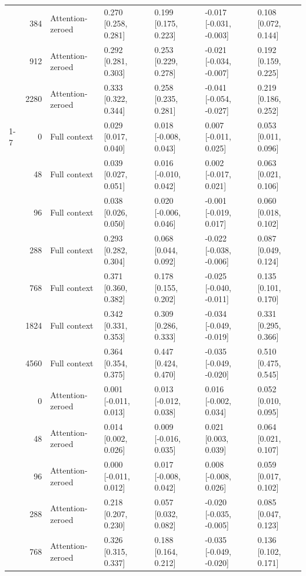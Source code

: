 \documentclass[11pt]{article}
\begin{document}
\begin{longtable}[t]{lrlllll}
\nopagebreak
 & 384 & Attention-zeroed & 0.270 [0.258, 0.281] & 0.199 [0.175, 0.223] & -0.017 [-0.031, -0.003] & 0.108 [0.072, 0.144]\\
\nopagebreak
 & 912 & Attention-zeroed & 0.292 [0.281, 0.303] & 0.253 [0.229, 0.278] & -0.021 [-0.034, -0.007] & 0.192 [0.159, 0.225]\\
\nopagebreak
\multirow{-14}{*}{\raggedright\arraybackslash BabyLM-125M} & 2280 & Attention-zeroed & 0.333 [0.322, 0.344] & 0.258 [0.235, 0.281] & -0.041 [-0.054, -0.027] & 0.219 [0.186, 0.252]\\
\cmidrule{1-7}\pagebreak[0]
 & 0 & Full context & 0.029 [0.017, 0.040] & 0.018 [-0.008, 0.043] & 0.007 [-0.011, 0.025] & 0.053 [0.011, 0.096]\\
\nopagebreak
 & 48 & Full context & 0.039 [0.027, 0.051] & 0.016 [-0.010, 0.042] & 0.002 [-0.017, 0.021] & 0.063 [0.021, 0.106]\\
\nopagebreak
 & 96 & Full context & 0.038 [0.026, 0.050] & 0.020 [-0.006, 0.046] & -0.001 [-0.019, 0.017] & 0.060 [0.018, 0.102]\\
\nopagebreak
 & 288 & Full context & 0.293 [0.282, 0.304] & 0.068 [0.044, 0.092] & -0.022 [-0.038, -0.006] & 0.087 [0.049, 0.124]\\
\nopagebreak
 & 768 & Full context & 0.371 [0.360, 0.382] & 0.178 [0.155, 0.202] & -0.025 [-0.040, -0.011] & 0.135 [0.101, 0.170]\\
\nopagebreak
 & 1824 & Full context & 0.342 [0.331, 0.353] & 0.309 [0.286, 0.333] & -0.034 [-0.049, -0.019] & 0.331 [0.295, 0.366]\\
\nopagebreak
 & 4560 & Full context & 0.364 [0.354, 0.375] & 0.447 [0.424, 0.470] & -0.035 [-0.049, -0.020] & 0.510 [0.475, 0.545]\\
\nopagebreak
 & 0 & Attention-zeroed & 0.001 [-0.011, 0.013] & 0.013 [-0.012, 0.038] & 0.016 [-0.002, 0.034] & 0.052 [0.010, 0.095]\\
\nopagebreak
 & 48 & Attention-zeroed & 0.014 [0.002, 0.026] & 0.009 [-0.016, 0.035] & 0.021 [0.003, 0.039] & 0.064 [0.021, 0.107]\\
\nopagebreak
 & 96 & Attention-zeroed & 0.000 [-0.011, 0.012] & 0.017 [-0.008, 0.042] & 0.008 [-0.008, 0.026] & 0.059 [0.017, 0.102]\\
\nopagebreak
 & 288 & Attention-zeroed & 0.218 [0.207, 0.230] & 0.057 [0.032, 0.082] & -0.020 [-0.035, -0.005] & 0.085 [0.047, 0.123]\\
\nopagebreak
 & 768 & Attention-zeroed & 0.326 [0.315, 0.337] & 0.188 [0.164, 0.212] & -0.035 [-0.049, -0.020] & 0.136 [0.102, 0.171]\\

\end{longtable}
\end{document}
